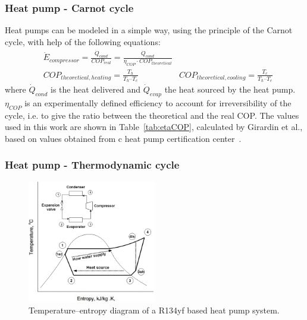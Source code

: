 \documentclass{article}
\begin{document}
\subsubsection{Heat pump - Carnot cycle}\label{sss:hp_carnot}
Heat pumps can be modeled in a simple way, using the principle of the Carnot cycle, with help of the following equations:
\begin{align}
    & \dot{E}_{compressor} = \frac{\dot{Q}_{cond}}{COP_{real}} = \frac{\dot{Q}_{cond}}{\eta_{COP} \cdot COP_{theoretical}} \\
    & COP_{theoretical, heating} =  \frac{T_{h}}{T_{h} – T_{c}}  
    & COP_{theoretical, cooling} =  \frac{T_{c}}{T_{h} – T_{c}} 
\end{align}
where $\dot{Q}_{cond}$ is the heat delivered and $\dot{Q}_{evap}$ the heat sourced by the heat pump. $\eta_{COP}$ is an experimentally defined efficiency to account for irreversibility of the cycle, i.e. to give the ratio between the theoretical and the real COP. The values used in this work are shown in Table~\ref{tab:etaCOP}, calculated by Girardin et al.\cite{girardinEnerGisGeographicalInformation2010}, based on values obtained from c heat pump certification center~\cite{NTBBuchsInstitut}. \\



\subsubsection{Heat pump - Thermodynamic cycle}\label{sss:hp_thermo}

\begin{figure}[htp]
	\centering
	\includegraphics[width=0.5\textwidth]{HP_cylce_ref.png}
	\caption{Temperature–entropy diagram of a R134yf based heat pump system.}
	\label{fig:hp_ref}
\end{figure}
\end{document}
